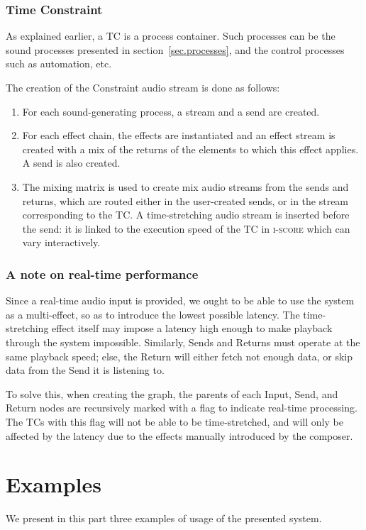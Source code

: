 \documentclass{article}
\newcommand*{\iscore}{\textsc{i-score}\xspace}
\newcommand*{\timeconstraint}{\ac{TC}\xspace}
\newcommand*{\timeconstraints}{\acp{TC}\xspace}
\begin{document}
\subsubsection{Time Constraint}
As explained earlier, a \timeconstraint is a process container.
Such processes can be the sound processes presented in section~\ref{sec.processes}, and 
the control processes such as automation, etc.

The creation of the Constraint audio stream is done as follows: 
\begin{enumerate}
    \item For each sound-generating process, a stream and a send are created.
    \item For each effect chain, the effects are instantiated and an effect stream is created with a mix of the returns of the elements to which this effect applies.
    A send is also created.
    \item The mixing matrix is used to create mix audio streams from the sends and returns, which are routed either in the user-created sends, or in the stream corresponding to the \timeconstraint.
    A time-stretching audio stream is inserted before the send: it is linked to the execution speed of the \timeconstraint in \iscore which can vary interactively.
\end{enumerate} 

\subsubsection{A note on real-time performance}
Since a real-time audio input is provided, we ought to be able to 
use the system as a multi-effect, so as to introduce the lowest possible latency.
The time-stretching effect itself may impose a latency high enough to make 
playback through the system impossible.
Similarly, Sends and Returns must operate at the same playback speed; else, the Return will either fetch not enough data, or skip data from the Send it is listening to. 

To solve this, when creating the graph, the parents of each Input, Send, and Return nodes are recursively marked 
with a flag to indicate real-time processing. 
The \timeconstraints with this flag will not be able to be time-stretched, and will only 
be affected by the latency due to the effects manually introduced by the composer.

\section{Examples}
We present in this part three examples of usage of the presented system.
\end{document}
